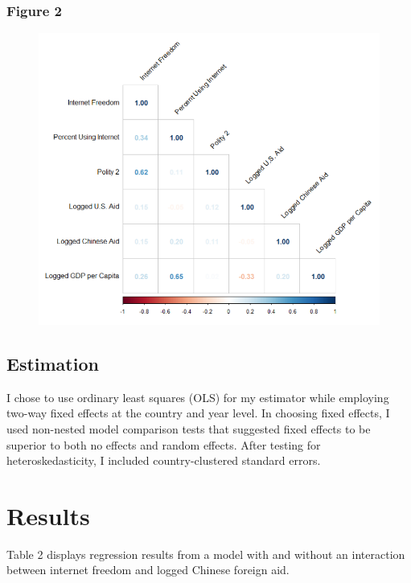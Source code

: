 \documentclass[12pt]{article}
\begin{document}
\pagebreak
\subsubsection*{Figure 2}
\begin{figure}[htbp]
    \includegraphics[scale=0.7]{628plot3.png}
\end{figure}

\subsection*{Estimation}
I chose to use ordinary least squares (OLS) for my estimator while employing two-way fixed effects at the country and year level. In choosing fixed effects, I used non-nested model comparison tests that suggested fixed effects to be superior to both no effects and random effects. After testing for heteroskedasticity, I included country-clustered standard errors. 

\pagebreak
\section*{Results}
Table 2 displays regression results from a model with and without an interaction between internet freedom and logged Chinese foreign aid.
\end{document}
